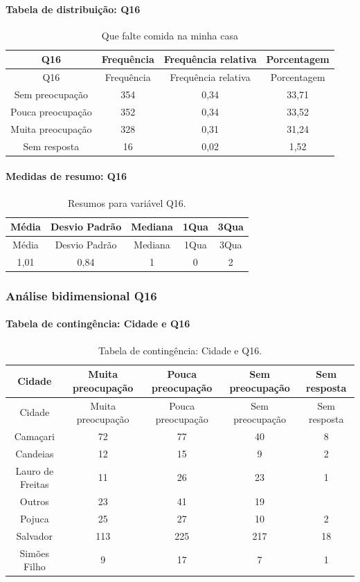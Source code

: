 \documentclass[]{article}
\let\oldparagraph\paragraph
\renewcommand{\paragraph}[1]{\oldparagraph{#1}\mbox{}}
\begin{document}
\hypertarget{tabela-de-distribuiuxe7uxe3o-q16}{%
\paragraph{Tabela de distribuição: Q16}\label{tabela-de-distribuiuxe7uxe3o-q16}}

\begin{longtable}[]{@{}cccc@{}}
\caption{\label{tab:unnamed-chunk-128}Que falte comida na minha casa}\tabularnewline
\toprule
Q16 & Frequência & Frequência relativa & Porcentagem\tabularnewline
\midrule
\endfirsthead
\toprule
Q16 & Frequência & Frequência relativa & Porcentagem\tabularnewline
\midrule
\endhead
Sem preocupação & 354 & 0,34 & 33,71\tabularnewline
Pouca preocupação & 352 & 0,34 & 33,52\tabularnewline
Muita preocupação & 328 & 0,31 & 31,24\tabularnewline
Sem resposta & 16 & 0,02 & 1,52\tabularnewline
\bottomrule
\end{longtable}

\hypertarget{medidas-de-resumo-q16}{%
\paragraph{Medidas de resumo: Q16}\label{medidas-de-resumo-q16}}

\begin{longtable}[]{@{}ccccc@{}}
\caption{\label{tab:unnamed-chunk-129}Resumos para variável Q16.}\tabularnewline
\toprule
Média & Desvio Padrão & Mediana & 1Qua & 3Qua\tabularnewline
\midrule
\endfirsthead
\toprule
Média & Desvio Padrão & Mediana & 1Qua & 3Qua\tabularnewline
\midrule
\endhead
1,01 & 0,84 & 1 & 0 & 2\tabularnewline
\bottomrule
\end{longtable}

\cleardoublepage

\hypertarget{anuxe1lise-bidimensional-q16}{%
\subsubsection{Análise bidimensional Q16}\label{anuxe1lise-bidimensional-q16}}

\hypertarget{tabela-de-continguxeancia-cidade-e-q16}{%
\paragraph{Tabela de contingência: Cidade e Q16}\label{tabela-de-continguxeancia-cidade-e-q16}}

\begin{longtable}[]{@{}ccccc@{}}
\caption{\label{tab:unnamed-chunk-130}Tabela de contingência: Cidade e Q16.}\tabularnewline
\toprule
Cidade & Muita preocupação & Pouca preocupação & Sem preocupação & Sem resposta\tabularnewline
\midrule
\endfirsthead
\toprule
Cidade & Muita preocupação & Pouca preocupação & Sem preocupação & Sem resposta\tabularnewline
\midrule
\endhead
Camaçari & 72 & 77 & 40 & 8\tabularnewline
Candeias & 12 & 15 & 9 & 2\tabularnewline
Lauro de Freitas & 11 & 26 & 23 & 1\tabularnewline
Outros & 23 & 41 & 19 &\tabularnewline
Pojuca & 25 & 27 & 10 & 2\tabularnewline
Salvador & 113 & 225 & 217 & 18\tabularnewline
Simões Filho & 9 & 17 & 7 & 1\tabularnewline
\bottomrule
\end{longtable}
\end{document}

